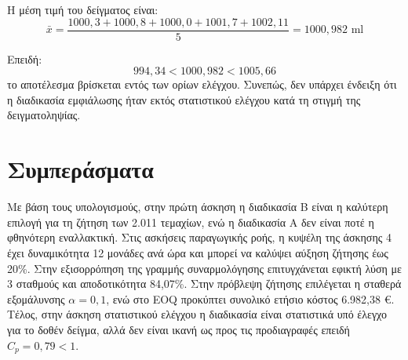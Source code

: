 \documentclass[12pt,a4paper]{article}
\begin{document}
Η μέση τιμή του δείγματος είναι:
\[
\bar{x}=\frac{1000{,}3+1000{,}8+1000{,}0+1001{,}7+1002{,}11}{5}
=1000{,}982 \text{ ml}
\]

Επειδή:
\[
994{,}34 < 1000{,}982 < 1005{,}66
\]
το αποτέλεσμα βρίσκεται εντός των ορίων ελέγχου. Συνεπώς, δεν υπάρχει ένδειξη ότι η διαδικασία εμφιάλωσης ήταν εκτός στατιστικού ελέγχου κατά τη στιγμή της δειγματοληψίας.

\section*{Συμπεράσματα}

Με βάση τους υπολογισμούς, στην πρώτη άσκηση η διαδικασία Β είναι η καλύτερη επιλογή για τη ζήτηση των 2.011 τεμαχίων, ενώ η διαδικασία Α δεν είναι ποτέ η φθηνότερη εναλλακτική. Στις ασκήσεις παραγωγικής ροής, η κυψέλη της άσκησης 4 έχει δυναμικότητα 12 μονάδες ανά ώρα και μπορεί να καλύψει αύξηση ζήτησης έως 20\%. Στην εξισορρόπηση της γραμμής συναρμολόγησης επιτυγχάνεται εφικτή λύση με 3 σταθμούς και αποδοτικότητα 84,07\%. Στην πρόβλεψη ζήτησης επιλέγεται η σταθερά εξομάλυνσης \(\alpha=0{,}1\), ενώ στο EOQ προκύπτει συνολικό ετήσιο κόστος 6.982,38 €. Τέλος, στην άσκηση στατιστικού ελέγχου η διαδικασία είναι στατιστικά υπό έλεγχο για το δοθέν δείγμα, αλλά δεν είναι ικανή ως προς τις προδιαγραφές επειδή \(C_p=0{,}79<1\).
\end{document}
